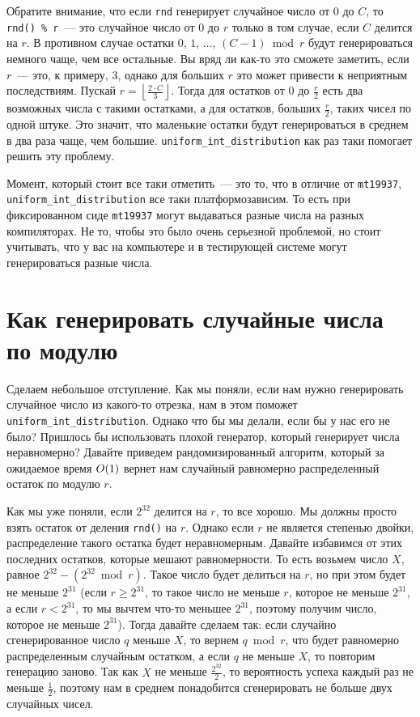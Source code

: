 Обратите внимание, что если \verb+rnd+ генерирует случайное число от $0$ до $C$, то \verb+rnd() % r+~--- это случайное число от $0$ до $r$ только в том случае, если $C$ делится на $r$. В противном случае остатки $0$, $1$, $\ldots$, $\left(C - 1\right) \bmod r$ будут генерироваться немного чаще, чем все остальные. Вы вряд ли как-то это сможете заметить, если $r$~--- это, к примеру, $3$, однако для больших $r$ это может привести к неприятным последствиям. Пускай $r = \left\lfloor \frac{2 \cdot C}{3} \right\rfloor$. Тогда для остатков от $0$ до $\frac{r}{2}$ есть два возможных числа с такими остатками, а для остатков, больших $\frac{r}{2}$, таких чисел по одной штуке. Это значит, что маленькие остатки будут генерироваться в среднем в два раза чаще, чем большие. \verb+uniform_int_distribution+ как раз таки помогает решить эту проблему.

Момент, который стоит все таки отметить~--- это то, что в отличие от \verb+mt19937+, \verb+uniform_int_distribution+ все таки платформозависим. То есть при фиксированном сиде \verb+mt19937+ могут выдаваться разные числа на разных компиляторах. Не то, чтобы это было очень серьезной проблемой, но стоит учитывать, что у вас на компьютере и в тестирующей системе могут генерироваться разные числа.

\section{Как генерировать случайные числа по модулю}

Сделаем небольшое отступление. Как мы поняли, если нам нужно генерировать случайное число из какого-то отрезка, нам в этом поможет \verb+uniform_int_distribution+. Однако что бы мы делали, если бы у нас его не было? Пришлось бы использовать плохой генератор, который генерирует числа неравномерно? Давайте приведем рандомизированный алгоритм, который за ожидаемое время $O(1)$ вернет нам случайный равномерно распределенный остаток по модулю $r$.

Как мы уже поняли, если $2^{32}$ делится на $r$, то все хорошо. Мы должны просто взять остаток от деления \verb+rnd()+ на $r$. Однако если $r$ не является степенью двойки, распределение такого остатка будет неравномерным. Давайте избавимся от этих последних остатков, которые мешают равномерности. То есть возьмем число $X$, равное $2^{32} - (2^{32} \bmod r)$. Такое число будет делиться на $r$, но при этом будет не меньше $2^{31}$ (если $r \ge 2^{31}$, то такое число не меньше $r$, которое не меньше $2^{31}$, а если $r < 2^{31}$, то мы вычтем что-то меньшее $2^{31}$, поэтому получим число, которое не меньше $2^{31}$). Тогда давайте сделаем так: если случайно сгенерированное число $q$ меньше $X$, то вернем $q \bmod r$, что будет равномерно распределенным случайным остатком, а если $q$ не меньше $X$, то повторим генерацию заново. Так как $X$ не меньше $\frac{2^{32}}{2}$, то вероятность успеха каждый раз не меньше $\frac{1}{2}$, поэтому нам в среднем понадобится сгенерировать не больше двух случайных чисел.

